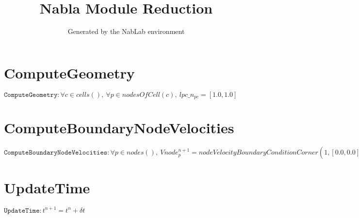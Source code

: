 \documentclass[11pt]{article}
\title{Nabla Module Reduction}
\author{Generated by the NabLab environment}
\begin{document}
\maketitle


\section{ComputeGeometry}
$\texttt{ComputeGeometry} : \forall{c\in cells()}, \ \forall{p\in nodesOfCell(c)}, \ lpc\_n_{pc} = \left[1.0,1.0\right]$


\section{ComputeBoundaryNodeVelocities}
$\texttt{ComputeBoundaryNodeVelocities} : \forall{p\in nodes()}, \ Vnode^{n+1}_{p} = nodeVelocityBoundaryConditionCorner\left(1,\left[0.0,0.0\right],1,\left[0.0,0.0\right],\left[\left[1.0,1.0\right],\left[1.0,1.0\right]\right],\left[1.0,1.0\right],\sum_{c\in cellsOfNode(p)}\left(lpc\_n_{pc}\right)\right)$


\section{UpdateTime}
$\texttt{UpdateTime} : t^{n+1} = t^{n} + \delta t$
\end{document}
